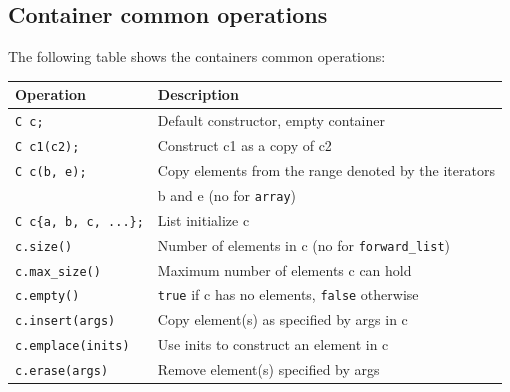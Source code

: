 \subsection{Container common operations}

The following table shows the containers common operations:

\begin{table}[H]
    \centering
    \begin{tabular}{@{}ll@{}}
    \toprule
    \textbf{Operation}              & \textbf{Description}  \\ \midrule                                                                           
    \texttt{C c;}                   & Default constructor, empty container                                                                       \\
    \texttt{C c1(c2);}              & Construct c1 as a copy of c2                                                                               \\
    \texttt{C c(b, e);}             & Copy elements from the range denoted by the iterators \\
                                    & b and e (no for \texttt{array})  \\
    \texttt{C c\{a, b, c, ...\};}   & List initialize c                                                                                         \\
    \texttt{c.size()}               & Number of elements in c (no for \texttt{forward\_list})                                                   \\
    \texttt{c.max\_size()}          & Maximum number of elements c can hold                                                                     \\
    \texttt{c.empty()}              & \texttt{true} if c has no elements, \texttt{false} otherwise                                              \\
    \texttt{c.insert(args)}         & Copy element(s) as specified by args in c                                                                 \\ 
    \texttt{c.emplace(inits)}       & Use inits to construct an element in c                                                                    \\
    \texttt{c.erase(args)}          & Remove element(s) specified by args                                                                       \\

\end{tabular}
\end{table}
